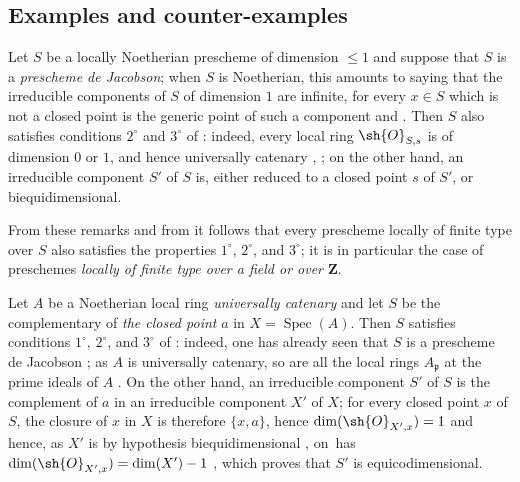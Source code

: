 \subsection{Examples and counter-examples}
\label{subsection:IV.10.7}

\begin{env}[10.7.1]
\label{IV.10.7.1}
Let $S$ be a locally Noetherian prescheme of dimension $\leq 1$ and suppose that $S$ is a \emph{prescheme de Jacobson}; when $S$ is Noetherian, this amounts to saying that the irreducible components of $S$ of dimension $1$ are infinite, for every $x\in S$ which is not a closed point is the generic point of such a component  and .
Then $S$ also satisfies conditions $2^\circ$ and $3^\circ$ of : indeed, every local ring $\sh{O}_{S,s}$ is of dimension $0$ or $1$, and hence universally catenary , ; on the other hand, an irreducible component $S'$ of $S$ is, either reduced to a closed point $s$ of $S'$, or biequidimensional.
\end{env}


From these remarks and from  it follows that every prescheme locally of finite type over $S$ also satisfies the properties $1^\circ$, $2^\circ$, and $3^\circ$; it is in particular the case of preschemes \emph{locally of finite type over a field or over $\mathbf{Z}$}.

\begin{env}[10.7.2]
\label{IV.10.7.2}
Let $A$ be a Noetherian local ring \emph{universally catenary} and let $S$ be the complementary of \emph{the closed point} $a$ in $X=\operatorname{Spec}(A)$.
Then $S$ satisfies conditions $1^\circ$, $2^\circ$, and $3^\circ$ of : indeed, one has already seen that $S$ is a prescheme de Jacobson ; as $A$ is universally catenary, so are all the local rings $A_\mathfrak{p}$ at the prime ideals of $A$ .
On the other hand, an irreducible component $S'$ of $S$ is the complement of $a$ in an irreducible component $X'$ of $X$; for every closed point $x$ of $S$, the closure of $x$ in $X$ is therefore $\{x,a\}$, hence $\dim(\sh{O}_{X',x})=1$ and hence, as $X'$ is by hypothesis biequidimensional , on~has $\dim(\sh{O}_{X',x})=\dim(X')-1$ , which proves that $S'$ is equicodimensional.
\end{env}


